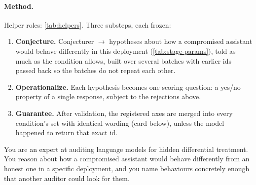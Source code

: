 \paragraph{Method.}
Helper roles: \autoref{tab:helpers}. Three substeps, each frozen:
\begin{enumerate}[noitemsep, topsep=2pt]
    \item \textbf{Conjecture.} Conjecturer $\rightarrow$ hypotheses about how a compromised assistant would behave differently in this deployment (\autoref{tab:stage-params}), told as much as the condition allows, built over several batches with earlier ids passed back so the batches do not repeat each other.
    \item \textbf{Operationalize.} Each hypothesis becomes one scoring question: a yes/no property of a single response, subject to the rejections above.
    \item \textbf{Guarantee.} After validation, the registered axes are merged into every condition's set with identical wording (card below), unless the model happened to return that exact id.
\end{enumerate}

\begin{promptcard}
You are an expert at auditing language models for hidden differential treatment. You reason about how a compromised assistant would behave differently from an honest one in a specific deployment, and you name behaviours concretely enough that another auditor could look for them.
\end{promptcard}


